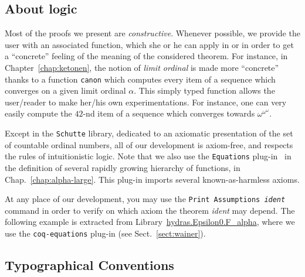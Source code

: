 \documentclass[a4paper]{book}
\begin{document}
\subsection{About logic}

Most of the proofs we present are \emph{constructive}. Whenever possible, we provide the user with an associated function, which she or he can apply in \gallina{} or \ocaml{} in order to get a ``concrete'' feeling of the meaning of the considered theorem.
For instance, in Chapter~\vref{chap:ketonen}, the notion of \emph{limit ordinal} is
made more ``concrete'' thanks to a function \texttt{canon} which computes every item of a sequence which converges on a given limit ordinal $\alpha$. This simply typed function allows the user/reader to make her/his own experimentations.
For instance, one can very easily compute the $42$-nd item of a sequence which converges towards $\omega^{\omega^\omega}$.


 
Except in the \texttt{Schutte} library, dedicated to an axiomatic presentation of the set of countable ordinal numbers, all of our development is axiom-free, and respects the rules of intuitionistic logic. Note that we also use the \texttt{Equations} plug-in~\cite{sozeau:hal-01671777} in the definition of  several rapidly growing hierarchy of functions, in Chap.~\ref{chap:alpha-large}. This plug-in imports several known-as-harmless  axioms.



At any place of our development, you may use the  \texttt{Print Assumptions {\it ident}} command in order to verify on which axiom the theorem {\it ident} may depend. The following example is extracted from 
Library~\href{../theories/html/hydras.Epsilon0.F_alpha.html}{hydras.Epsilon0.F\_alpha}, where we use the \texttt{coq-equations} plug-in (see Sect.~\vref{sect:wainer}).




\subsection{Typographical Conventions}
\end{document}
